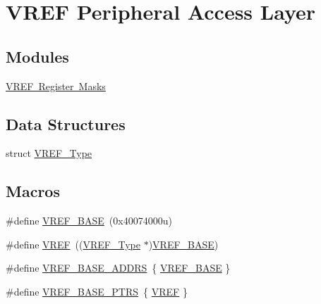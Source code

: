 \hypertarget{group___v_r_e_f___peripheral___access___layer}{}\section{V\+R\+EF Peripheral Access Layer}
\label{group___v_r_e_f___peripheral___access___layer}
\subsection*{Modules}
\begin{DoxyCompactItemize}
\item 
\mbox{\hyperlink{group___v_r_e_f___register___masks}{V\+R\+E\+F Register Masks}}
\end{DoxyCompactItemize}
\subsection*{Data Structures}
\begin{DoxyCompactItemize}
\item 
struct \mbox{\hyperlink{struct_v_r_e_f___type}{V\+R\+E\+F\+\_\+\+Type}}
\end{DoxyCompactItemize}
\subsection*{Macros}
\begin{DoxyCompactItemize}
\item 
\#define \mbox{\hyperlink{group___v_r_e_f___peripheral___access___layer_ga4a13ce72546505561e4a780677ec0375}{V\+R\+E\+F\+\_\+\+B\+A\+SE}}~(0x40074000u)
\item 
\#define \mbox{\hyperlink{group___v_r_e_f___peripheral___access___layer_ga2c9e85d22a9ba37ea589b1747af46307}{V\+R\+EF}}~((\mbox{\hyperlink{struct_v_r_e_f___type}{V\+R\+E\+F\+\_\+\+Type}} $\ast$)\mbox{\hyperlink{group___v_r_e_f___peripheral___access___layer_ga4a13ce72546505561e4a780677ec0375}{V\+R\+E\+F\+\_\+\+B\+A\+SE}})
\item 
\#define \mbox{\hyperlink{group___v_r_e_f___peripheral___access___layer_gac0ccacace16937d7109589180bb2650b}{V\+R\+E\+F\+\_\+\+B\+A\+S\+E\+\_\+\+A\+D\+D\+RS}}~\{ \mbox{\hyperlink{group___v_r_e_f___peripheral___access___layer_ga4a13ce72546505561e4a780677ec0375}{V\+R\+E\+F\+\_\+\+B\+A\+SE}} \}
\item 
\#define \mbox{\hyperlink{group___v_r_e_f___peripheral___access___layer_ga3eb17aee5de4a519ee18fe763e43865b}{V\+R\+E\+F\+\_\+\+B\+A\+S\+E\+\_\+\+P\+T\+RS}}~\{ \mbox{\hyperlink{group___v_r_e_f___peripheral___access___layer_ga2c9e85d22a9ba37ea589b1747af46307}{V\+R\+EF}} \}
\end{DoxyCompactItemize}


